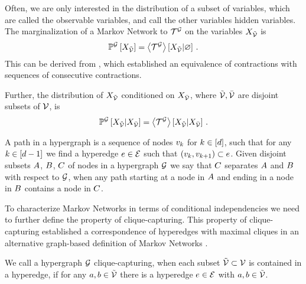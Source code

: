 Often, we are only interested in the distribution of a subset of variables, which are called the observable variables, and call the other variables hidden variables.
The marginalization of a Markov Network to $\mathcal{T}^{\mathcal{G}}$ on the variables $X_{\tilde{\mathcal{V}}}$ is
	\[
		\mathbb{P}^{\mathcal{G}}\left[X_{\tilde{\mathcal{V}}}\right]
		= \left\langle \mathcal{T}^{\mathcal{G}}\right\rangle \left[ X_{\tilde{\mathcal{V}}} | \varnothing \right] \, . 
	\]
This can be derived from , which established an equivalence of contractions with sequences of consecutive contractions.


Further, the distribution of $X_{\tilde{\mathcal{V}}}$ conditioned on $X_{\bar{\mathcal{V}}}$, where $\tilde{\mathcal{V}},\bar{\mathcal{V}}$ are disjoint subsets of $\mathcal{V}$, is
	\[
		\mathbb{P}^{\mathcal{G}}\left[ X_{\tilde{\mathcal{V}}} | X_{\bar{\mathcal{V}}}\right] 
		= \left\langle \mathcal{T}^{\mathcal{G}}\right\rangle \left[ X_{\tilde{\mathcal{V}}} | X_{\bar{\mathcal{V}}} \right] \, . 
	\]

\begin{definition}
	A path in a hypergraph is a sequence of nodes $v_{k}$ for $k\in[d]$, such that for any $k\in[d-1]$ we find a hyperedge $e\in\mathcal{E}$ such that $(v_{k}, v_{k+1})\subset e$.
	Given disjoint subsets $A$, $B$, $C$ of nodes in a hypergraph $\mathcal{G}$ we say that $C$ separates $A$ and $B$ with respect to $\mathcal{G}$, when any path starting at a node in $A$ and ending in a node in $B$ contains a node in $C$.
\end{definition}

To characterize Markov Networks in terms of conditional independencies we need to further define the property of clique-capturing.
This property of clique-capturing established a correspondence of hyperedges with maximal cliques in an alternative graph-based definition of Markov Networks \cite{koller_probabilistic_2009}.

\begin{definition}\label{def:ccHypergraph}
	We call a hypergraph $\mathcal{G}$ clique-capturing, when each subset $\tilde{\mathcal{V}}\subset\mathcal{V}$ is contained in a hyperedge, if for any $a,b\in\tilde{\mathcal{V}}$ there is a hyperedge $e\in\mathcal{E}$ with $a,b\in\tilde{\mathcal{V}}$.
\end{definition}

